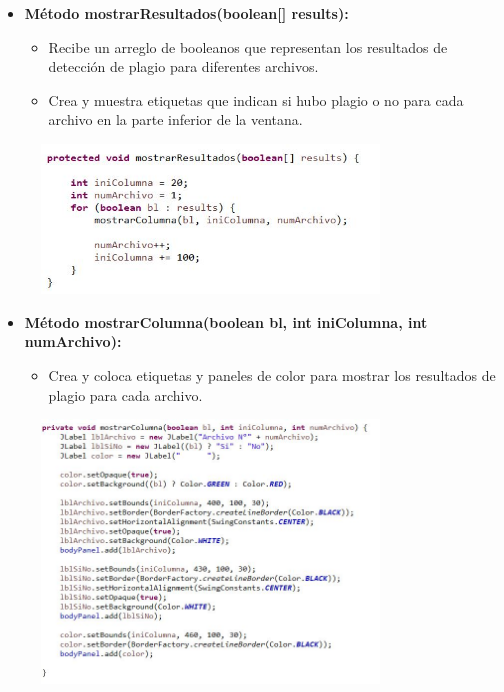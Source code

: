 \documentclass{article}
\begin{document}
	\begin{itemize}
	\item \textbf{Método mostrarResultados(boolean[] results):}
	 \begin{itemize}
	 \item Recibe un arreglo de booleanos que representan los resultados de detección de plagio para diferentes archivos.
	 \item Crea y muestra etiquetas que indican si hubo plagio o no para cada archivo en la parte inferior de la ventana.
	 \end{itemize}
	\end{itemize}
	 \begin{figure}[H]
		\centering
		\includegraphics[width=0.8\textwidth,keepaspectratio]{img/GUI5.jpg}
	\end{figure}
	
	\begin{itemize}
	\item \textbf{Método mostrarColumna(boolean bl, int iniColumna, int numArchivo):}
	 \begin{itemize}
	 \item Crea y coloca etiquetas y paneles de color para mostrar los resultados de plagio para cada archivo.
	 \end{itemize}
	\end{itemize}
	 \begin{figure}[H]
		\centering
		\includegraphics[width=0.8\textwidth,keepaspectratio]{img/GUI6.jpg}
	\end{figure}
\clearpage		
	
\end{document}
